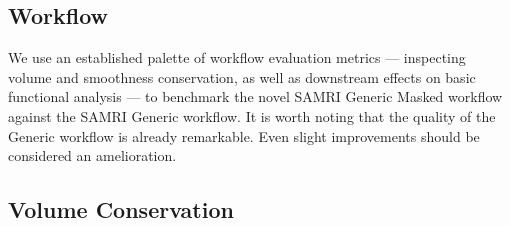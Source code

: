 \subsection{Workflow}

We use an established palette of workflow evaluation metrics --- inspecting volume and smoothness conservation, as well as downstream effects on basic functional analysis \cite{ioanas_optimized_2019} --- to benchmark the novel SAMRI Generic Masked workflow against the SAMRI Generic workflow.
It is worth noting that the quality of the Generic workflow is already remarkable.
Even slight improvements should be considered an amelioration.

\subsection{Volume Conservation}

